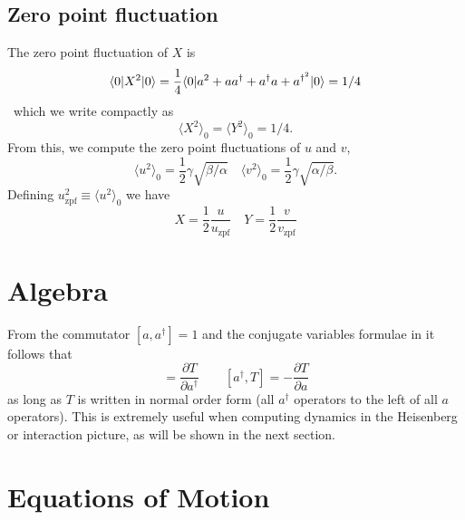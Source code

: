 \subsection{Zero point fluctuation}

The zero point fluctuation of $X$ is \begin{equation}
\langle 0 | X^2 | 0 \rangle = \frac{1}{4}\langle 0 | a^2 + aa^{\dagger} + a^{\dagger}a + a^{\dagger^2} | 0 \rangle = 1/4 \end{equation}\
which we write compactly as \begin{equation}
\langle X^2 \rangle_0 = \langle Y^2 \rangle_0 = 1/4 . \end{equation}
From this, we compute the zero point fluctuations of $u$ and $v$, \begin{equation}
\langle u^2 \rangle_0 = \frac{1}{2}\gamma \sqrt{\beta / \alpha} \quad \langle v^2 \rangle_0 = \frac{1}{2}\gamma \sqrt{\alpha / \beta} . \end{equation}
Defining $u_{\textrm{zpf}}^2 \equiv \langle u^2 \rangle_0 $ we have \begin{equation}
X = \frac{1}{2}\frac{u}{u_{\textrm{zpf}}} \quad Y = \frac{1}{2}\frac{v}{v_{\textrm{zpf}}} \end{equation}

\section{Algebra}

From the commutator $ [a,a^{\dagger}]=1 $ and the conjugate variables formulae in \citeinternaltype {} it follows that \begin{equation}
[a,T] = \frac{\partial T}{\partial a^{\dagger}} \qquad [a^{\dagger},T] = -\frac{\partial T}{\partial a}\end{equation}
as long as $T$ is written in normal order form (all $a^{\dagger}$ operators to the left of all $a$ operators).
This is extremely useful when computing dynamics in the Heisenberg or interaction picture, as will be shown in the next section.

\section{Equations of Motion}

